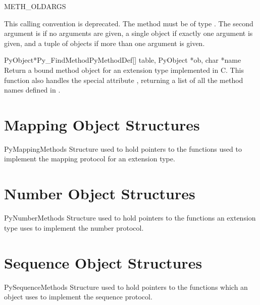 \documentclass{manual}
\begin{document}
\begin{datadesc}{METH_OLDARGS}

This calling convention is deprecated. The method must be of type
. The second argument is \NULL{} if no arguments
are given, a single object if exactly one argument is given, and a
tuple of objects if more than one argument is given.

\end{datadesc}

\begin{cfuncdesc}{PyObject*}{Py_FindMethod}{PyMethodDef[] table,
                                            PyObject *ob, char *name}
Return a bound method object for an extension type implemented in C.
This function also handles the special attribute ,
returning a list of all the method names defined in .
\end{cfuncdesc}


\section{Mapping Object Structures \label{mapping-structs}}

\begin{ctypedesc}{PyMappingMethods}
Structure used to hold pointers to the functions used to implement the 
mapping protocol for an extension type.
\end{ctypedesc}


\section{Number Object Structures \label{number-structs}}

\begin{ctypedesc}{PyNumberMethods}
Structure used to hold pointers to the functions an extension type
uses to implement the number protocol.
\end{ctypedesc}


\section{Sequence Object Structures \label{sequence-structs}}

\begin{ctypedesc}{PySequenceMethods}
Structure used to hold pointers to the functions which an object uses
to implement the sequence protocol.
\end{ctypedesc}
\end{document}
